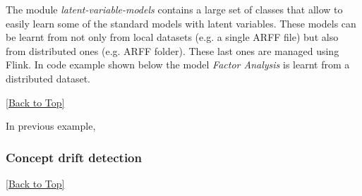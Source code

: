 \documentclass[10pt,a4paper]{article}
\begin{document}
The module \textit{latent-variable-models} contains a large set of classes that allow to easily learn some of the standard models with latent variables. These models can be learnt from not only from local datasets (e.g. a single ARFF file) but also from distributed ones (e.g. ARFF folder). These last ones are managed using Flink. In code example shown below the model \textit{Factor Analysis} is learnt from a distributed dataset.  


\hyperref[sec:flinklink]{[Back to Top]}\newline 

In previous example, 


\subsubsection{Concept drift detection}\label{sec:flinklink:ext:conceptdrift}



\hyperref[sec:flinklink]{[Back to Top]}\newline 
\end{document}
